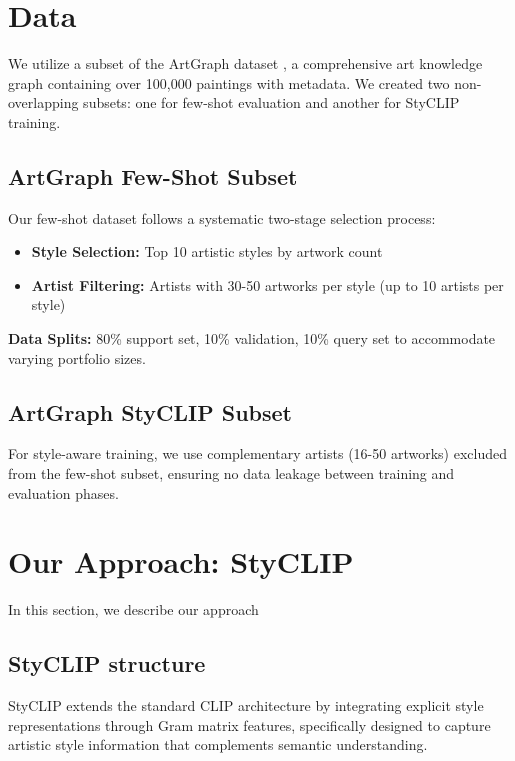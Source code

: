 \documentclass[conference,6pt]{IEEEtran}
\begin{document}
\section{Data}

We utilize a subset of the ArtGraph dataset \cite{ArtGraph}, a comprehensive art knowledge graph containing over 100,000 paintings with metadata. We created two non-overlapping subsets: one for few-shot evaluation and another for StyCLIP training.

\subsection{ArtGraph Few-Shot Subset}

Our few-shot dataset follows a systematic two-stage selection process:

\begin{itemize}
    \item \textbf{Style Selection:} Top 10 artistic styles by artwork count
    \item \textbf{Artist Filtering:} Artists with 30-50 artworks per style (up to 10 artists per style)
\end{itemize}

\textbf{Data Splits:} 80\% support set, 10\% validation, 10\% query set to accommodate varying portfolio sizes.

\subsection{ArtGraph StyCLIP Subset}

For style-aware training, we use complementary artists (16-50 artworks) excluded from the few-shot subset, ensuring no data leakage between training and evaluation phases.
\section{Our Approach: StyCLIP}

In this section, we describe our approach

\subsection{StyCLIP structure}

StyCLIP extends the standard CLIP architecture by integrating explicit style representations through Gram matrix features, specifically designed to capture artistic style information that complements semantic understanding. 
\end{document}
